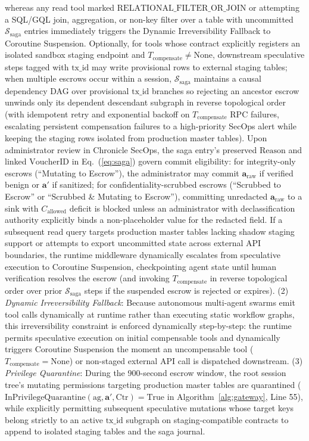 \documentclass[conference,10pt]{IEEEtran}
\begin{document}
whereas any read tool marked $\text{RELATIONAL\_FILTER\_OR\_JOIN}$ or attempting a SQL/GQL join, aggregation, or non-key filter over a table with uncommitted $\mathcal{S}_{\text{saga}}$ entries immediately triggers the Dynamic Irreversibility Fallback to Coroutine Suspension. Optionally, for tools whose contract explicitly registers an isolated sandbox staging endpoint and $T_{\text{compensate}} \ne \text{None}$, downstream speculative steps tagged with $\text{tx\_id}$ may write provisional rows to external staging tables; when multiple escrows occur within a session, $\mathcal{S}_{\text{saga}}$ maintains a causal dependency DAG over provisional $\text{tx\_id}$ branches so rejecting an ancestor escrow unwinds only its dependent descendant subgraph in reverse topological order (with idempotent retry and exponential backoff on $T_{\text{compensate}}$ RPC failures, escalating persistent compensation failures to a high-priority SecOps alert while keeping the staging rows isolated from production master tables). Upon administrator review in Chronicle SecOps, the saga entry's preserved $\text{Reason}$ and linked $\text{VoucherID}$ in Eq.~(\ref{eq:saga}) govern commit eligibility: for integrity-only escrows (``Mutating to Escrow''), the administrator may commit $\mathbf{a}_{\text{raw}}$ if verified benign or $\mathbf{a}'$ if sanitized; for confidentiality-scrubbed escrows (``Scrubbed to Escrow'' or ``Scrubbed \& Mutating to Escrow''), committing unredacted $\mathbf{a}_{\text{raw}}$ to a sink with $C_{\text{allowed}}$ deficit is blocked unless an administrator with declassification authority explicitly binds a non-placeholder value for the redacted field. If a subsequent read query targets production master tables lacking shadow staging support or attempts to export uncommitted state across external API boundaries, the runtime middleware dynamically escalates from speculative execution to Coroutine Suspension, checkpointing agent state until human verification resolves the escrow (and invoking $T_{\text{compensate}}$ in reverse topological order over prior $\mathcal{S}_{\text{saga}}$ steps if the suspended escrow is rejected or expires). (2) \textit{Dynamic Irreversibility Fallback}: Because autonomous multi-agent swarms emit tool calls dynamically at runtime rather than executing static workflow graphs, this irreversibility constraint is enforced dynamically step-by-step: the runtime permits speculative execution on initial compensable tools and dynamically triggers Coroutine Suspension the moment an uncompensable tool ($T_{\text{compensate}} = \text{None}$) or non-staged external API call is dispatched downstream. (3) \textit{Privilege Quarantine}: During the 900-second escrow window, the root session tree's mutating permissions targeting production master tables are quarantined ($\text{InPrivilegeQuarantine}(\text{ag}, \mathbf{a}', \text{Ctr}) = \text{True}$ in Algorithm~\ref{alg:gateway}, Line 55), while explicitly permitting subsequent speculative mutations whose target keys belong strictly to an active $\text{tx\_id}$ subgraph on staging-compatible contracts to append to isolated staging tables and the saga journal.
\end{document}
